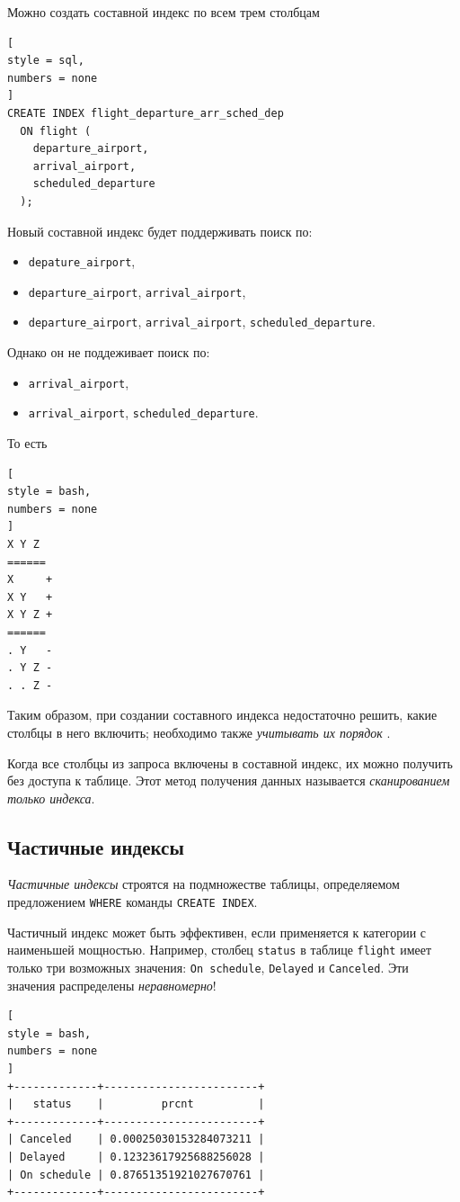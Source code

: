 \documentclass[%
	11pt,
	a4paper,
	utf8,
		]{article}
\begin{document}
Можно создать составной индекс по всем трем столбцам
\begin{lstlisting}[
style = sql,
numbers = none	
]
CREATE INDEX flight_departure_arr_sched_dep
  ON flight (
    departure_airport,
    arrival_airport,
    scheduled_departure
  );
\end{lstlisting}

Новый составной индекс будет поддерживать поиск по:
\begin{itemize}
	\item \verb|depature_airport|,
	
	\item \verb|departure_airport|, \verb|arrival_airport|,
	
	\item \verb|departure_airport|, \verb|arrival_airport|, \verb|scheduled_departure|.
\end{itemize}

Однако он не поддеживает поиск по:
\begin{itemize}
	\item \verb|arrival_airport|,
	
	\item \verb|arrival_airport|, \verb|scheduled_departure|.
\end{itemize}

То есть
\begin{lstlisting}[
style = bash,
numbers = none
]
X Y Z
======
X     +
X Y   +
X Y Z +
======
. Y   -
. Y Z -
. . Z -
\end{lstlisting}

Таким образом, при создании составного индекса недостаточно решить, какие столбцы в него включить; необходимо также \emph{учитывать их порядок} \cite[]{dombrovskaya:postgresql-2022}.

Когда все столбцы из запроса включены в составной индекс, их можно получить без доступа к таблице. Этот метод получения данных называется \emph{сканированием только индекса}.

\subsection{Частичные индексы}

\emph{Частичные индексы} строятся на подмножестве таблицы, определяемом предложением \verb|WHERE| команды \verb|CREATE INDEX|.

Частичный индекс может быть эффективен, если применяется к категории с наименьшей мощностью. Например, столбец \verb|status| в таблице \verb|flight| имеет только три возможных значения: \verb|On schedule|, \verb|Delayed| и \verb|Canceled|. Эти значения распределены \emph{неравномерно}!
\begin{lstlisting}[
style = bash,
numbers = none
]
+-------------+------------------------+
|   status    |         prcnt          |
+-------------+------------------------+
| Canceled    | 0.00025030153284073211 |
| Delayed     | 0.12323617925688256028 |
| On schedule | 0.87651351921027670761 |
+-------------+------------------------+
\end{lstlisting}
\end{document}
